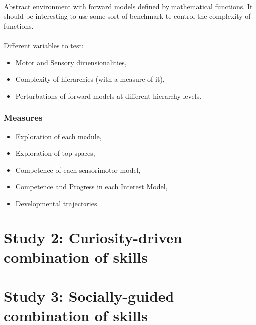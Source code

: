 \documentclass[12pt]{article}
\begin{document}
			\paragraph{}
			Abstract environment with forward models defined by mathematical functions. 
			It should be interesting to use some sort of benchmark to control the complexity of functions.
					
			\paragraph{}
			Different variables to test:
			\begin{itemize}
				\item Motor and Sensory dimensionalities,
				\item Complexity of hierarchies (with a measure of it),
				\item Perturbations of forward models at different hierarchy levels.
			\end{itemize}
		
		
		\subsubsection{Measures}
		
			\begin{itemize}
				\item Exploration of each module,
				\item Exploration of top spaces,
				\item Competence of each sensorimotor model,
				\item Competence and Progress in each Interest Model,
				\item Developmental trajectories.
			\end{itemize}
			
		
	
	
%


\section{Study 2: Curiosity-driven combination of skills}
\label{study2}


%


\section{Study 3: Socially-guided combination of skills}
\label{study3}

%



\small


\end{document}

